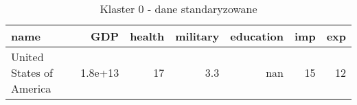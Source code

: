 \begin{table}
    \centering
    \caption{Klaster 0 - dane standaryzowane}
    \label{tab:cl0std}
    \begin{tabular}{lrrrrrr}
        \toprule
        name                     & GDP     & health & military & education & imp & exp \\
        \midrule
        United States of America & 1.8e+13 & 17     & 3.3      & nan       & 15  & 12  \\
        \bottomrule
    \end{tabular}
\end{table}
